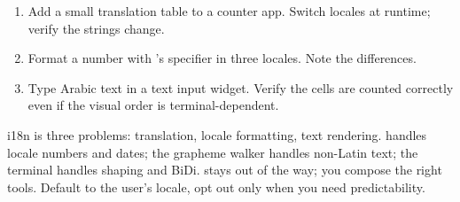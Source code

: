 \begin{enumerate}[leftmargin=*]
  \item Add a small translation table to a counter app. Switch
    locales at runtime; verify the strings change.
  \item Format a number with 's 
    specifier in three locales. Note the differences.
  \item Type Arabic text in a text input widget. Verify the
    cells are counted correctly even if the visual order is
    terminal-dependent.
\end{enumerate}

\begin{recap}
i18n is three problems: translation, locale formatting, text
rendering.  handles locale numbers and dates;
the grapheme walker handles non-Latin text; the terminal handles
shaping and BiDi. \maya{} stays out of the way; you compose the
right tools. Default to the user's locale, opt out only when you
need predictability.
\end{recap}
